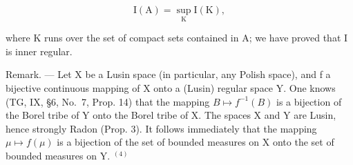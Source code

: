 \[
\mathrm{I} (\mathrm{A}) = \sup _ {\mathrm{K}} \mathrm{I} (\mathrm{K}),
\]

where K runs over the set of compact sets contained in A; we have proved that I is inner regular.

Remark. --- Let X be a Lusin space (in particular, any Polish space), and f a bijective continuous mapping of X onto a (Lusin) regular space Y. One knows (TG, IX, §6, No.~7, Prop. 14) that the mapping \(B \mapsto f^{-1}(B)\) is a bijection of the Borel tribe of Y onto the Borel tribe of X. The spaces X and Y are Lusin, hence strongly Radon (Prop. 3). It follows immediately that the mapping \(\mu \mapsto f(\mu)\) is a bijection of the set of bounded measures on X onto the set of bounded measures on Y. \(^{(4)}\)

